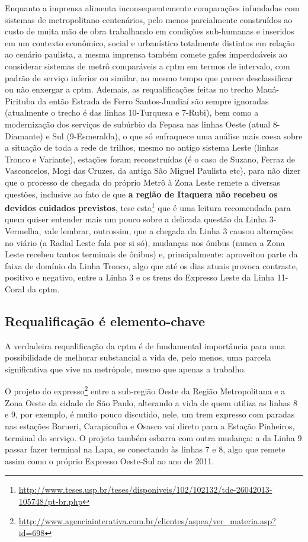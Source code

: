 \documentclass[11pt,fleqn]{book} %
\begin{document}
Enquanto a imprensa alimenta inconsequentemente comparações infundadas com sistemas de metropolitano centenários, pelo menos parcialmente construídos ao custo de muita mão de obra trabalhando em condições sub-humanas e inseridos em um contexto econômico, social e urbanístico totalmente distintos em relação ao cenário paulista, a mesma imprensa também comete gafes imperdoáveis ao considerar sistemas de metrô comparáveis a \gls{cptm} em termos de intervalo, com padrão de serviço inferior ou similar, ao mesmo tempo que parece desclassificar ou não enxergar a \gls{cptm}. Ademais, as requalificações feitas no trecho Mauá-Pirituba da então Estrada de Ferro Santos-Jundiaí são sempre ignoradas (atualmente o trecho é das linhas 10-Turquesa e 7-Rubi), bem como a modernização dos serviços de subúrbio da Fepasa nas linhas Oeste (atual 8-Diamante) e Sul (9-Esmeralda), o que só enfraquece uma análise mais coesa sobre a situação de toda a rede de trilhos, mesmo no antigo sistema Leste (linhas Tronco e Variante), estações foram reconstruídas (é o caso de Suzano, Ferraz de Vasconcelos, Mogi das Cruzes, da antiga São Miguel Paulista etc), para não dizer que o processo de chegada do próprio Metrô à Zona Leste remete a diversas questões, inclusive ao fato de que \textbf{a região de Itaquera não recebeu os devidos cuidados previstos}, tese esta\footnote{\url{http://www.teses.usp.br/teses/disponiveis/102/102132/tde-26042013-105748/pt-br.php}} que é uma leitura recomendada para quem quiser entender mais um pouco sobre a delicada questão da Linha 3-Vermelha, vale lembrar, outrossim, que a chegada da Linha 3 causou alterações no viário (a Radial Leste fala por si só), mudanças nos ônibus (nunca a Zona Leste recebeu tantos terminais de ônibus) e, principalmente: aproveitou parte da faixa de domínio da Linha Tronco, algo que até os dias atuais provoca contraste, positivo e negativo, entre a Linha 3 e os trens do Expresso Leste da Linha 11-Coral da \gls{cptm}.

\subsection{Requalificação é elemento-chave}

A verdadeira requalificação da \gls{cptm} é de fundamental importância para uma possibilidade de melhorar substancial a vida de, pelo menos, uma parcela significativa que vive na metrópole, mesmo que apenas a trabalho.

O projeto do expresso\footnote{\url{http://www.agenciainterativa.com.br/clientes/aspea/ver_materia.asp?id=698}} entre a sub-região Oeste da Região Metropolitana e a Zona Oeste da cidade de São Paulo, alterando a vida de quem utiliza as linhas 8 e 9, por exemplo, é muito pouco discutido, nele, um trem expresso com paradas nas estações Barueri, Carapicuíba e Osasco vai direto para a Estação Pinheiros, terminal do serviço. O projeto também esbarra com outra mudança: a da Linha 9 passar fazer terminal na Lapa, se conectando às linhas 7 e 8, algo que remete assim como o próprio Expresso Oeste-Sul ao ano de 2011.
\end{document}
